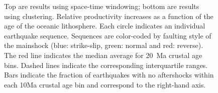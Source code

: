 \documentclass[draft]{agujournal}
\begin{document}
\begin{figure}[H]
    \caption{Top are results using space-time windowing; bottom are results using \citet{Zaliapin2008} clustering. Relative productivity increases as a function of the age of the oceanic lithosphere. Each circle indicates an individual earthquake sequence. Sequences are color-coded by faulting style of the mainshock (blue: strike-slip, green: normal and red: reverse). The red line indicates the median average for 20~Ma crustal age bins. Dashed lines indicate the corresponding interquartile ranges. Bars indicate the fraction of earthquakes with no aftershocks within each 10Ma crustal age bin and correspond to the right-hand axis.}
        \label{fig:prod_vs_age_z2008}
\end{figure}


\newpage
\end{document}
